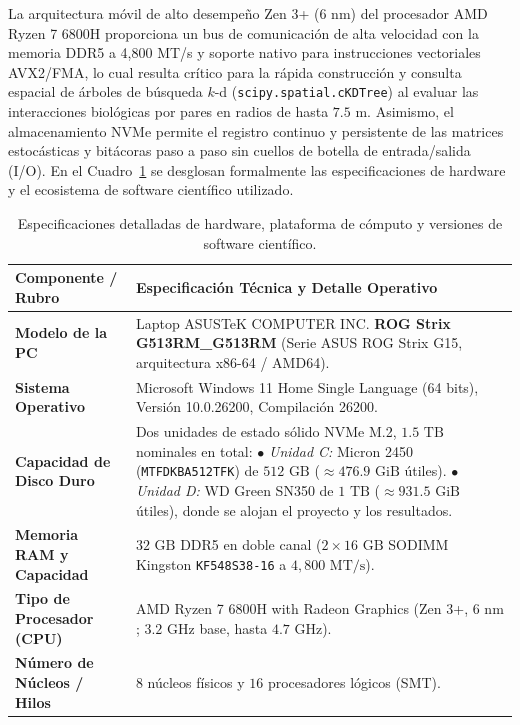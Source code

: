 \documentclass[11pt,a4paper]{article}
\begin{document}
La arquitectura móvil de alto desempeño Zen 3+ (6 nm) del procesador AMD Ryzen 7 6800H proporciona un bus de comunicación de alta velocidad con la memoria DDR5 a 4,800 MT/s y soporte nativo para instrucciones vectoriales AVX2/FMA, lo cual resulta crítico para la rápida construcción y consulta espacial de árboles de búsqueda $k$-d (\texttt{scipy.spatial.cKDTree}) al evaluar las interacciones biológicas por pares en radios de hasta $7.5\text{ m}$. Asimismo, el almacenamiento NVMe permite el registro continuo y persistente de las matrices estocásticas y bitácoras paso a paso sin cuellos de botella de entrada/salida (I/O). En el Cuadro~\ref{tab:hardware_software} se desglosan formalmente las especificaciones de hardware y el ecosistema de software científico utilizado.

\begin{table}[H]
\centering
\small
\caption{Especificaciones detalladas de hardware, plataforma de cómputo y versiones de software científico.}\label{tab:hardware_software}
\begin{tabularx}{\textwidth}{lX}
\toprule
\textbf{Componente / Rubro} & \textbf{Especificación Técnica y Detalle Operativo} \\
\midrule
\textbf{Modelo de la PC} & Laptop ASUSTeK COMPUTER INC. \textbf{ROG Strix G513RM\_G513RM} (Serie ASUS ROG Strix G15, arquitectura x86-64 / AMD64). \\
\addlinespace
\textbf{Sistema Operativo} & Microsoft Windows 11 Home Single Language (64 bits), Versión 10.0.26200, Compilación 26200. \\
\addlinespace
\textbf{Capacidad de Disco Duro} & Dos unidades de estado sólido NVMe M.2, $1.5\text{ TB}$ nominales en total: \newline
$\bullet$ \textit{Unidad C:} Micron 2450 (\texttt{MTFDKBA512TFK}) de $512\text{ GB}$ ($\approx 476.9\text{ GiB}$ útiles). \newline
$\bullet$ \textit{Unidad D:} WD Green SN350 de $1\text{ TB}$ ($\approx 931.5\text{ GiB}$ útiles), donde se alojan el proyecto y los resultados. \\
\addlinespace
\textbf{Memoria RAM y Capacidad} & $32\text{ GB}$ DDR5 en doble canal ($2 \times 16\text{ GB}$ SODIMM Kingston \texttt{KF548S38-16} a $4,800\text{ MT/s}$). \\
\addlinespace
\textbf{Tipo de Procesador (CPU)} & AMD Ryzen 7 6800H with Radeon Graphics (Zen 3+, $6\text{ nm}$; $3.2\text{ GHz}$ base, hasta $4.7\text{ GHz}$). \\
\addlinespace
\textbf{Número de Núcleos / Hilos} & $8$ núcleos físicos y $16$ procesadores lógicos (SMT). \\

\end{tabularx}
\end{table}
\end{document}
